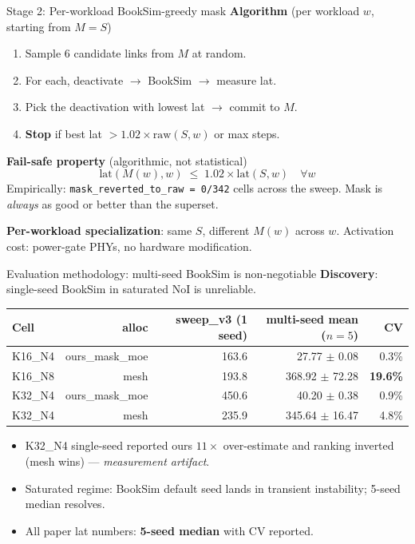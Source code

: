\documentclass[aspectratio=169]{beamer}
\begin{document}
\begin{frame}{Stage 2: Per-workload BookSim-greedy mask}
\textbf{Algorithm} (per workload $w$, starting from $M{=}S$)
\begin{enumerate}\small
  \item Sample 6 candidate links from $M$ at random.
  \item For each, deactivate $\to$ BookSim $\to$ measure lat.
  \item Pick the deactivation with lowest lat $\to$ commit to $M$.
  \item \textbf{Stop} if best lat $> 1.02 \times \text{raw}(S, w)$ or max steps.
\end{enumerate}

\medskip
\textbf{Fail-safe property} (algorithmic, not statistical)
\[
\text{lat}(M(w), w) \;\le\; 1.02 \times \text{lat}(S, w)
\quad\forall w
\]
Empirically: \texttt{mask\_reverted\_to\_raw = 0/342} cells across the
sweep. Mask is \emph{always} as good or better than the superset.

\medskip
\textbf{Per-workload specialization}: same $S$, different $M(w)$ across
$w$. Activation cost: power-gate PHYs, no hardware modification.
\end{frame}

\begin{frame}{Evaluation methodology: multi-seed BookSim is non-negotiable}
\textbf{Discovery}: single-seed BookSim in saturated NoI is unreliable.

\medskip
\centering\scriptsize
\begin{tabular}{lrrrr}
\toprule
Cell & alloc & sweep\_v3 (1 seed) & multi-seed mean ($n{=}5$) & CV \\
\midrule
K16\_N4 & ours\_mask\_moe & 163.6 & \alert{27.77 $\pm$ 0.08} & 0.3\% \\
K16\_N8 & mesh            & 193.8 & \alert{368.92 $\pm$ 72.28} & \textbf{19.6\%} \\
K32\_N4 & ours\_mask\_moe & 450.6 & \alert{40.20 $\pm$ 0.38} & 0.9\% \\
K32\_N4 & mesh            & 235.9 & \alert{345.64 $\pm$ 16.47} & 4.8\% \\
\bottomrule
\end{tabular}

\medskip
\normalsize
\begin{itemize}
  \item K32\_N4 single-seed reported ours $11\times$ over-estimate
        and ranking inverted (mesh wins) --- \emph{measurement artifact}.
  \item Saturated regime: BookSim default seed lands in transient
        instability; 5-seed median resolves.
  \item All paper lat numbers: \textbf{5-seed median} with CV reported.
\end{itemize}
\end{frame}
\end{document}
